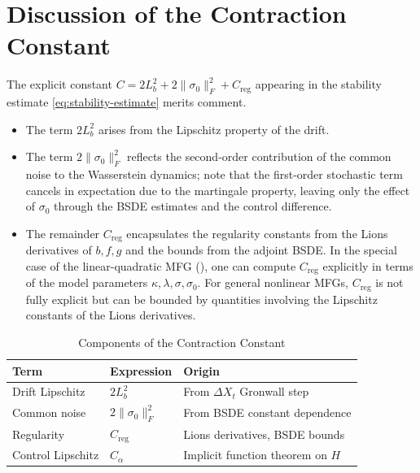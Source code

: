 \section{Discussion of the Contraction Constant}
\label{sec:wp-discussion}

The explicit constant $C = 2L_b^2 + 2\|\sigma_0\|_F^2 + C_{\mathrm{reg}}$ appearing in
the stability estimate \eqref{eq:stability-estimate} merits comment.

\begin{itemize}
    \item The term $2L_b^2$ arises from the Lipschitz property of the drift.
    \item The term $2\|\sigma_0\|_F^2$ reflects the second-order contribution of the
    common noise to the Wasserstein dynamics; note that the first-order stochastic
    term cancels in expectation due to the martingale property, leaving only the
    effect of $\sigma_0$ through the BSDE estimates and the control difference.
    \item The remainder $C_{\mathrm{reg}}$ encapsulates the regularity constants from
    the Lions derivatives of $b, f, g$ and the bounds from the adjoint BSDE. In the
    special case of the linear-quadratic MFG (), one can compute
    $C_{\mathrm{reg}}$ explicitly in terms of the model parameters $\kappa, \lambda,
    \sigma, \sigma_0$. For general nonlinear MFGs, $C_{\mathrm{reg}}$ is not fully
    explicit but can be bounded by quantities involving the Lipschitz constants of the
    Lions derivatives.
\end{itemize}

\begin{table}[ht]
\centering
\caption{Components of the Contraction Constant}
\label{tab:contraction-constant}
\begin{tabular}{llp{6cm}}
\toprule
\textbf{Term} & \textbf{Expression} & \textbf{Origin} \\
\midrule
Drift Lipschitz & $2L_b^2$ & From $\Delta X_t$ Gronwall step \\
Common noise & $2\|\sigma_0\|_F^2$ & From BSDE constant dependence \\
Regularity & $C_{\mathrm{reg}}$ & Lions derivatives, BSDE bounds \\
Control Lipschitz & $C_\alpha$ & Implicit function theorem on $H$ \\
\bottomrule
\end{tabular}
\end{table}

